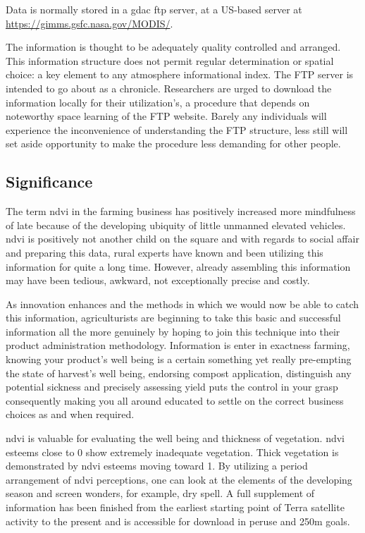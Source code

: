 Data is normally stored in a \gls{gdac} \gls{ftp} server, at a US-based server at \url{https://gimms.gsfc.nasa.gov/MODIS/}.

The information is thought to be adequately quality controlled and arranged. This information structure does not permit regular determination or spatial choice: a key element to any atmosphere informational index. The FTP server is intended to go about as a chronicle. Researchers are urged to download the information locally for their utilization's, a procedure that depends on noteworthy space learning of the FTP website. Barely any individuals will experience the inconvenience of understanding the FTP structure, less still will set aside opportunity to make the procedure less demanding for other people.

\subsection{Significance}

The term \gls{ndvi} in the farming business has positively increased more mindfulness of late because of the developing ubiquity of little unmanned elevated vehicles. \gls{ndvi} is positively not another child on the square and with regards to social affair and preparing this data, rural experts have known and been utilizing this information for quite a long time. However, already assembling this information may have been tedious, awkward, not exceptionally precise and costly. 

As innovation enhances and the methods in which we would now be able to catch this information, agriculturists are beginning to take this basic and successful information all the more genuinely by hoping to join this technique into their product administration methodology. Information is enter in exactness farming, knowing your product's well being is a certain something yet really pre-empting the state of harvest's well being, endorsing compost application, distinguish any potential sickness and precisely assessing yield puts the control in your grasp consequently making you all around educated to settle on the correct business choices as and when required.

\gls{ndvi} is valuable for evaluating the well being and thickness of vegetation. \gls{ndvi} esteems close to 0 show extremely inadequate vegetation. Thick vegetation is demonstrated by \gls{ndvi} esteems moving toward 1. By utilizing a period arrangement of \gls{ndvi} perceptions, one can look at the elements of the developing season and screen wonders, for example, dry spell. A full supplement of information has been finished from the earliest starting point of Terra satellite activity to the present and is accessible for download in peruse and 250m goals.



